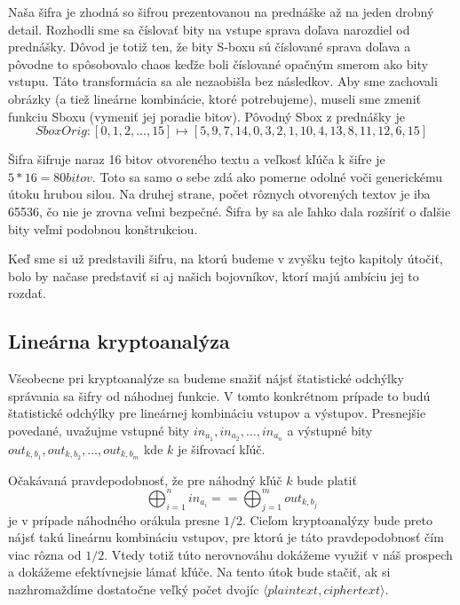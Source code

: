\begin{poznamka}
    Naša šifra je zhodná so šifrou prezentovanou na prednáške až na
    jeden drobný detail. Rozhodli sme sa číslovať bity na vstupe
    sprava doľava narozdiel od prednášky. Dôvod je totiž ten, že bity
    S-boxu sú číslované sprava doľava a pôvodne to spôsobovalo chaos
    keďže boli číslované opačným smerom ako bity vstupu. Táto
    transformácia sa ale nezaobišla bez následkov. Aby sme zachovali
    obrázky (a tiež lineárne kombinácie, ktoré potrebujeme), museli
    sme zmeniť funkciu Sboxu (vymeniť jej poradie bitov).
    Pôvodný Sbox z prednášky je
    \begin{equation*}
    SboxOrig:[0,1,2,\dots,15] \mapsto
    [5, 9, 7, 14, 0, 3, 2, 1, 10, 4, 13, 8, 11, 12, 6, 15]
    \end{equation*}
\end{poznamka}

Šifra šifruje naraz 16 bitov otvoreného textu a 
veľkosť kľúča k šifre je $5*16=80\unit{bitov}$.
Toto sa samo o sebe zdá ako pomerne odolné voči generickému útoku
hrubou silou. Na druhej strane, počet rôznych otvorených textov je iba
65536, čo nie je zrovna veľmi bezpečné. Šifra by sa ale ľahko dala
rozšíriť o ďalšie bity veľmi podobnou konštrukciou.

Keď sme si už predstavili šifru, na ktorú budeme v zvyšku tejto
kapitoly útočiť, bolo by načase predstaviť si aj našich bojovníkov,
ktorí majú ambíciu jej to rozdať.

\subsection{Lineárna kryptoanalýza}

Všeobecne pri kryptoanalýze sa budeme snažiť nájsť štatistické odchýlky
správania sa šifry od náhodnej funkcie.
V tomto konkrétnom prípade to budú štatistické odchýlky
pre lineárnej kombináciu vstupov a výstupov.
Presnejšie povedané, uvažujme vstupné bity
$in_{a_1},in_{a_2},\dots,in_{a_n}$ a výstupné bity
$out_{k,b_1},out_{k,b_2},\dots,out_{k,b_m}$ kde $k$ je šifrovací kľúč.

Očakávaná pravdepodobnosť, že pre náhodný kľúč $k$ bude platiť
\begin{equation}
    \label{eq:lin_approx}
    \bigoplus_{i=1}^n in_{a_i} == \bigoplus_{j=1}^{m} out_{k,b_j}
\end{equation}
je v prípade náhodného orákula presne $1/2$. Cieľom kryptoanalýzy bude
preto nájsť takú lineárnu kombináciu vstupov, pre ktorú je táto
pravdepodobnosť čím viac rôzna od $1/2$. Vtedy totiž túto nerovnováhu
dokážeme využiť v náš prospech a dokážeme efektívnejsie lámať kľúče.
Na tento útok bude stačiť, ak si nazhromaždíme dostatočne veľký počet
dvojíc $\langle plaintext, ciphertext \rangle$.

